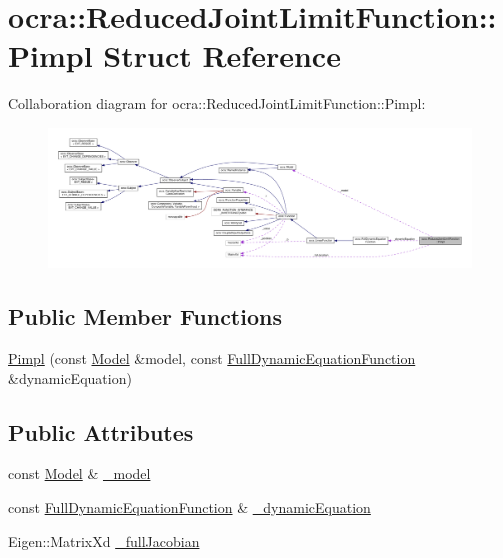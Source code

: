 \hypertarget{structReducedJointLimitFunction_1_1Pimpl}{}\section{ocra\+:\+:Reduced\+Joint\+Limit\+Function\+:\+:Pimpl Struct Reference}
\label{structReducedJointLimitFunction_1_1Pimpl}


Collaboration diagram for ocra\+:\+:Reduced\+Joint\+Limit\+Function\+:\+:Pimpl\+:
\nopagebreak
\begin{figure}[H]
\begin{center}
\leavevmode
\includegraphics[width=350pt]{d0/d8b/structReducedJointLimitFunction_1_1Pimpl__coll__graph}
\end{center}
\end{figure}
\subsection*{Public Member Functions}
\begin{DoxyCompactItemize}
\item 
\hyperlink{structReducedJointLimitFunction_1_1Pimpl_a144b5331a7812ad5859215d57f8fd250}{Pimpl} (const \hyperlink{classocra_1_1Model}{Model} \&model, const \hyperlink{classocra_1_1FullDynamicEquationFunction}{Full\+Dynamic\+Equation\+Function} \&dynamic\+Equation)
\end{DoxyCompactItemize}
\subsection*{Public Attributes}
\begin{DoxyCompactItemize}
\item 
const \hyperlink{classocra_1_1Model}{Model} \& \hyperlink{structReducedJointLimitFunction_1_1Pimpl_abe6f625fec9bf8cff9f847bde9eb9ee2}{\+\_\+model}
\item 
const \hyperlink{classocra_1_1FullDynamicEquationFunction}{Full\+Dynamic\+Equation\+Function} \& \hyperlink{structReducedJointLimitFunction_1_1Pimpl_ad483380d3fcdd2da03a85d22947cf31d}{\+\_\+dynamic\+Equation}
\item 
Eigen\+::\+Matrix\+Xd \hyperlink{structReducedJointLimitFunction_1_1Pimpl_ae45e80b72fb13b54452c6ce9fe9e3798}{\+\_\+full\+Jacobian}
\end{DoxyCompactItemize}


